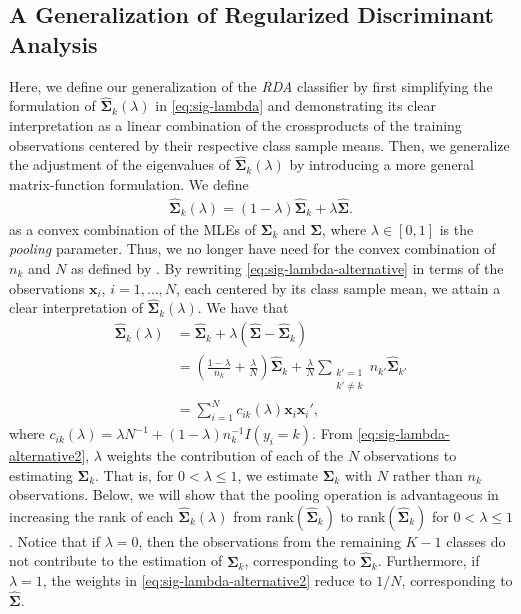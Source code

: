 \documentclass[11pt]{article}
\begin{document}
\subsection{A Generalization of Regularized Discriminant Analysis}

Here, we define our generalization of the \emph{RDA} classifier by first simplifying the formulation of $\widehat{\bm \Sigma}_k(\lambda)$ in \eqref{eq:sig-lambda} and demonstrating its clear interpretation as a linear combination of the crossproducts of the training observations centered by their respective class sample means. Then, we generalize the adjustment of the eigenvalues of $\widehat{\bm \Sigma}_k(\lambda)$ by introducing a more general matrix-function formulation.  We define
\begin{align}
  \widehat{\bm\Sigma}_k(\lambda) = (1 - \lambda) \widehat{\bm\Sigma}_k + \lambda \widehat{\bm\Sigma}.\label{eq:sig-lambda-alternative}
\end{align}
as a convex combination of the MLEs of $\bm \Sigma_k$ and $\bm \Sigma$, where $\lambda \in [0, 1]$ is the \emph{pooling} parameter. Thus, we no longer have need for the convex combination of $n_k$ and $N$ as defined by \cite{Friedman:1989tm}. By rewriting \eqref{eq:sig-lambda-alternative} in terms of the observations $\bm x_i$, $i = 1, \ldots, N$, each centered by its class sample mean, we attain a clear interpretation of $\widehat{\bm\Sigma}_k(\lambda)$. We have that
\begin{align}
	\widehat{\bm\Sigma}_k(\lambda) &= \widehat{\bm\Sigma}_k + \lambda (\widehat{\bm\Sigma} - \widehat{\bm\Sigma}_k) \nonumber\\
	&= \left( \frac{1 - \lambda}{n_k} + \frac{\lambda}{N} \right) \widehat{\bm\Sigma}_k +  \frac{\lambda}{N} \sum_{\substack{k' = 1\\k' \ne k}} n_{k'} \widehat{\bm\Sigma}_{k'} \nonumber \\
	&= \sum_{i=1}^N c_{ik}(\lambda) \bm x_i \bm x_i',\label{eq:sig-lambda-alternative2}
\end{align}
where $c_{ik}(\lambda) = \lambda N^{-1} + (1 - \lambda)n_k^{-1}I(y_i = k)$.
From \eqref{eq:sig-lambda-alternative2}, $\lambda$ weights the contribution of each of the $N$ observations to estimating $\bm \Sigma_k$. That is, for $0 < \lambda \le 1$, we estimate $\bm \Sigma_k$ with $N$ rather than $n_k$ observations. Below, we will show that the pooling operation is advantageous in increasing the rank of each $\widehat{\bm\Sigma}_k(\lambda)$ from rank$(\widehat{\bm\Sigma}_k)$ to rank$(\widehat{\bm\Sigma}_k)$ for $0 < \lambda \le 1$. Notice that if $\lambda  = 0$, then the observations from the remaining $K - 1$ classes do not contribute to the estimation of $\bm \Sigma_k$, corresponding to $\widehat{\bm \Sigma}_k$. Furthermore, if $\lambda = 1$, the weights in \eqref{eq:sig-lambda-alternative2} reduce to $1/N$, corresponding to $\widehat{\bm\Sigma}$.
\end{document}
